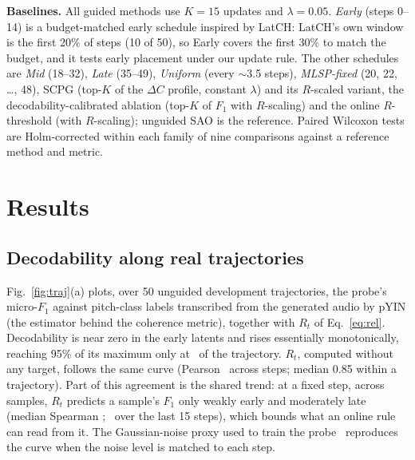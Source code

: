 \documentclass{article}
\begin{document}
\textbf{Baselines.} All guided methods use $K{=}15$ updates and $\lambda{=}0.05$. \emph{Early} (steps 0--14) is a budget-matched early schedule inspired by LatCH: LatCH's own window is the first 20\% of steps (10 of 50), so Early covers the first 30\% to match the budget, and it tests early placement under our update rule. The other schedules are \emph{Mid} (18--32), \emph{Late} (35--49), \emph{Uniform} (every $\sim$3.5 steps), \emph{MLSP-fixed} (20, 22, \dots, 48), SCPG (top-$K$ of the $\Delta C$ profile, constant $\lambda$) and its $R$-scaled variant, the decodability-calibrated ablation (top-$K$ of $F_1$ with $R$-scaling) and the online $R$-threshold (with $R$-scaling); unguided SAO is the reference. Paired Wilcoxon tests are Holm-corrected within each family of nine comparisons against a reference method and metric.

\section{Results}
\label{sec:results}

\subsection{Decodability along real trajectories}
\label{sec:expA}
Fig.~\ref{fig:traj}(a) plots, over 50 unguided development trajectories, the probe's micro-$F_1$ against pitch-class labels transcribed from the generated audio by pYIN (the estimator behind the coherence metric), together with $R_t$ of Eq.~\eqref{eq:rel}. Decodability is near zero in the early latents and rises essentially monotonically, reaching 95\% of its maximum only at \peakF\ of the trajectory. $R_t$, computed without any target, follows the same curve (Pearson \corrRF\ across steps; median 0.85 within a trajectory). Part of this agreement is the shared trend: at a fixed step, across samples, $R_t$ predicts a sample's $F_1$ only weakly early and moderately late (median Spearman \rhoFixedT; \rhoFixedTlate\ over the last 15 steps), which bounds what an online rule can read from it. The Gaussian-noise proxy used to train the probe~\cite{ye2026pitchclass} reproduces the curve when the noise level is matched to each step.
\end{document}
